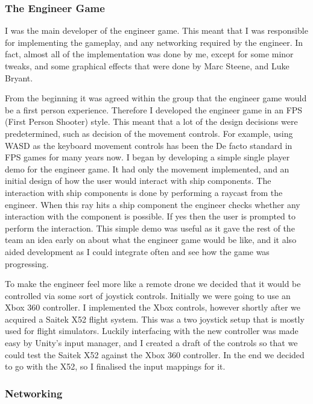 \documentclass[a4paper,11pt]{article}
\begin{document}
\subsubsection{The Engineer Game}

I was the main developer of the engineer game. This meant that I was responsible for implementing the gameplay, and any networking required by the engineer. In fact, almost all of the implementation was done by me, except for some minor tweaks, and some graphical effects that were done by Marc Steene, and Luke Bryant.

From the beginning it was agreed within the group that the engineer game would be a first person experience. Therefore I developed the engineer game in an FPS (First Person Shooter) style. This meant that a lot of the design decisions were predetermined, such as decision of the movement controls. For example, using WASD as the keyboard movement controls has been the De facto standard in FPS games for many years now. I began by developing a simple single player demo for the engineer game. It had only the movement implemented, and an initial design of how the user would interact with ship components. The interaction with ship components is done by performing a raycast from the engineer. When this ray hits a ship component the engineer checks whether any interaction with the component is possible. If yes then the user is prompted to perform the interaction. This simple demo was useful as it gave the rest of the team an idea early on about what the engineer game would be like, and it also aided development as I could integrate often and see how the game was progressing.

To make the engineer feel more like a remote drone we decided that it would be controlled via some sort of joystick controls. Initially we were going to use an Xbox 360 controller. I implemented the Xbox controls, however shortly after we acquired a Saitek X52 flight system. This was a two joystick setup that is mostly used for flight simulators. Luckily interfacing with the new controller was made easy by Unity’s input manager, and I created a draft of the controls so that we could test the Saitek X52 against the Xbox 360 controller. In the end we decided to go with the X52, so I finalised the input mappings for it.

\subsubsection{Networking}
\end{document}
